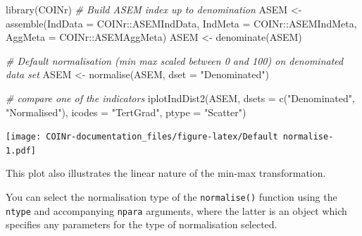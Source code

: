 \documentclass[
]{book}
\newenvironment{Shaded}{\begin{snugshade}}{\end{snugshade}}
\newcommand{\AttributeTok}[1]{\textcolor[rgb]{0.77,0.63,0.00}{#1}}
\newcommand{\CommentTok}[1]{\textcolor[rgb]{0.56,0.35,0.01}{\textit{#1}}}
\newcommand{\FunctionTok}[1]{\textcolor[rgb]{0.00,0.00,0.00}{#1}}
\newcommand{\NormalTok}[1]{#1}
\newcommand{\OtherTok}[1]{\textcolor[rgb]{0.56,0.35,0.01}{#1}}
\newcommand{\SpecialCharTok}[1]{\textcolor[rgb]{0.00,0.00,0.00}{#1}}
\newcommand{\StringTok}[1]{\textcolor[rgb]{0.31,0.60,0.02}{#1}}
\begin{document}
\begin{Shaded}
\begin{Highlighting}[]
\FunctionTok{library}\NormalTok{(COINr)}
\CommentTok{\# Build ASEM index up to denomination}
\NormalTok{ASEM }\OtherTok{\textless{}{-}} \FunctionTok{assemble}\NormalTok{(}\AttributeTok{IndData =}\NormalTok{ COINr}\SpecialCharTok{::}\NormalTok{ASEMIndData, }\AttributeTok{IndMeta =}\NormalTok{ COINr}\SpecialCharTok{::}\NormalTok{ASEMIndMeta, }\AttributeTok{AggMeta =}\NormalTok{ COINr}\SpecialCharTok{::}\NormalTok{ASEMAggMeta)}
\NormalTok{ASEM }\OtherTok{\textless{}{-}} \FunctionTok{denominate}\NormalTok{(ASEM)}

\CommentTok{\# Default normalisation (min max scaled between 0 and 100) on denominated data set}
\NormalTok{ASEM }\OtherTok{\textless{}{-}} \FunctionTok{normalise}\NormalTok{(ASEM, }\AttributeTok{dset =} \StringTok{"Denominated"}\NormalTok{)}

\CommentTok{\# compare one of the indicators}
\FunctionTok{iplotIndDist2}\NormalTok{(ASEM, }\AttributeTok{dsets =} \FunctionTok{c}\NormalTok{(}\StringTok{"Denominated"}\NormalTok{, }\StringTok{"Normalised"}\NormalTok{),}
              \AttributeTok{icodes =} \StringTok{"TertGrad"}\NormalTok{, }\AttributeTok{ptype =} \StringTok{"Scatter"}\NormalTok{)}
\end{Highlighting}
\end{Shaded}

\texttt{[image: COINr-documentation\_files/figure-latex/Default normalise-1.pdf]}

This plot also illustrates the linear nature of the min-max transformation.

You can select the normalisation type of the \texttt{normalise()} function using the \texttt{ntype} and accompanying \texttt{npara} arguments, where the latter is an object which specifies any parameters for the type of normalisation selected.
\end{document}
